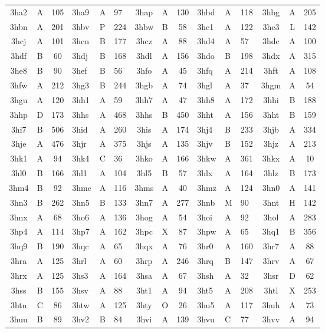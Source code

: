\begin{longtable}{|c|c|c| a|a|a| c|c|c| a|a|a| c|c|c|}
3ha2 & A & 105 & 3ha9 & A & 97 & 3hap & A & 130 & 3hbd & A & 118 & 3hbg & A & 205\\
3hbn & A & 201 & 3hbv & P & 224 & 3hbw & B & 58 & 3hc1 & A & 122 & 3hc3 & L & 142\\
3hcj & A & 101 & 3hcn & B & 177 & 3hcz & A & 88 & 3hd4 & A & 57 & 3hdc & A & 100\\
3hdf & B & 60 & 3hdj & B & 168 & 3hdl & A & 156 & 3hdo & B & 198 & 3hdx & A & 315\\
3he8 & B & 90 & 3hef & B & 56 & 3hfo & A & 45 & 3hfq & A & 214 & 3hft & A & 108\\
3hfw & A & 212 & 3hg3 & B & 244 & 3hgb & A & 74 & 3hgl & A & 37 & 3hgm & A & 54\\
3hgu & A & 120 & 3hh1 & A & 59 & 3hh7 & A & 47 & 3hh8 & A & 172 & 3hhi & B & 188\\
3hhp & D & 173 & 3hhs & A & 468 & 3hhs & B & 450 & 3hht & A & 156 & 3hht & B & 159\\
3hi7 & B & 506 & 3hid & A & 260 & 3his & A & 174 & 3hj4 & B & 233 & 3hjb & A & 334\\
3hje & A & 476 & 3hjr & A & 375 & 3hjs & A & 135 & 3hjv & B & 152 & 3hjz & A & 213\\
3hk1 & A & 94 & 3hk4 & C & 36 & 3hko & A & 166 & 3hkw & A & 361 & 3hkx & A & 10\\
3hl0 & B & 166 & 3hl1 & A & 104 & 3hl5 & B & 57 & 3hlx & A & 164 & 3hlz & B & 173\\
3hm4 & B & 92 & 3hmc & A & 116 & 3hms & A & 40 & 3hmz & A & 124 & 3hn0 & A & 141\\
3hn3 & B & 262 & 3hn5 & B & 133 & 3hn7 & A & 277 & 3hnb & M & 90 & 3hnt & H & 142\\
3hnx & A & 68 & 3ho6 & A & 136 & 3hog & A & 54 & 3hoi & A & 92 & 3hol & A & 283\\
3hp4 & A & 114 & 3hp7 & A & 162 & 3hpc & X & 87 & 3hpw & A & 65 & 3hq1 & B & 356\\
3hq9 & B & 190 & 3hqc & A & 65 & 3hqx & A & 76 & 3hr0 & A & 160 & 3hr7 & A & 88\\
3hra & A & 125 & 3hrl & A & 60 & 3hrp & A & 246 & 3hrq & B & 147 & 3hrv & A & 67\\
3hrx & A & 125 & 3hs3 & A & 164 & 3hsa & A & 67 & 3hsh & A & 32 & 3hsr & D & 62\\
3hss & B & 155 & 3hsv & A & 88 & 3ht1 & A & 94 & 3ht5 & A & 208 & 3htl & X & 253\\
3htn & C & 86 & 3htw & A & 125 & 3hty & O & 26 & 3hu5 & A & 117 & 3huh & A & 73\\
3huu & B & 89 & 3hv2 & B & 84 & 3hvi & A & 139 & 3hvu & C & 77 & 3hvv & A & 94\\

\end{longtable}
